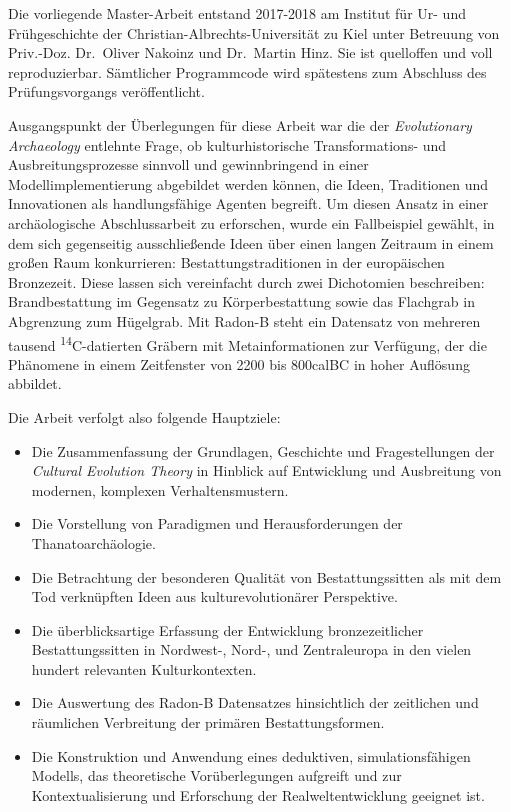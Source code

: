 \documentclass[openany,twoside,twocolumn]{book}
\providecommand{\tightlist}{%
  \setlength{\itemsep}{0pt}\setlength{\parskip}{0pt}}
\begin{document}
Die vorliegende Master-Arbeit entstand 2017-2018 am Institut für Ur- und
Frühgeschichte der Christian-Albrechts-Universität zu Kiel unter
Betreuung von Priv.-Doz. Dr.~Oliver Nakoinz und Dr.~Martin Hinz. Sie ist
quelloffen und voll reproduzierbar. Sämtlicher Programmcode wird
spätestens zum Abschluss des Prüfungsvorgangs veröffentlicht.

Ausgangspunkt der Überlegungen für diese Arbeit war die der
\emph{Evolutionary Archaeology} entlehnte Frage, ob kulturhistorische
Transformations- und Ausbreitungsprozesse sinnvoll und gewinnbringend in
einer Modellimplementierung abgebildet werden können, die Ideen,
Traditionen und Innovationen als handlungsfähige Agenten begreift. Um
diesen Ansatz in einer archäologische Abschlussarbeit zu erforschen,
wurde ein Fallbeispiel gewählt, in dem sich gegenseitig ausschließende
Ideen über einen langen Zeitraum in einem großen Raum konkurrieren:
Bestattungstraditionen in der europäischen Bronzezeit. Diese lassen sich
vereinfacht durch zwei Dichotomien beschreiben: Brandbestattung im
Gegensatz zu Körperbestattung sowie das Flachgrab in Abgrenzung zum
Hügelgrab. Mit Radon-B steht ein Datensatz von mehreren tausend
\textsuperscript{14}C-datierten Gräbern mit Metainformationen zur
Verfügung, der die Phänomene in einem Zeitfenster von 2200 bis 800calBC
in hoher Auflösung abbildet.

Die Arbeit verfolgt also folgende Hauptziele:

\begin{itemize}
\tightlist
\item
  Die Zusammenfassung der Grundlagen, Geschichte und Fragestellungen der
  \emph{Cultural Evolution Theory} in Hinblick auf Entwicklung und
  Ausbreitung von modernen, komplexen Verhaltensmustern.
\item
  Die Vorstellung von Paradigmen und Herausforderungen der
  Thanatoarchäologie.
\item
  Die Betrachtung der besonderen Qualität von Bestattungssitten als mit
  dem Tod verknüpften Ideen aus kulturevolutionärer Perspektive.
\item
  Die überblicksartige Erfassung der Entwicklung bronzezeitlicher
  Bestattungssitten in Nordwest-, Nord-, und Zentraleuropa in den vielen
  hundert relevanten Kulturkontexten.
\item
  Die Auswertung des Radon-B Datensatzes hinsichtlich der zeitlichen und
  räumlichen Verbreitung der primären Bestattungsformen.
\item
  Die Konstruktion und Anwendung eines deduktiven, simulationsfähigen
  Modells, das theoretische Vorüberlegungen aufgreift und zur
  Kontextualisierung und Erforschung der Realweltentwicklung geeignet
  ist.
\end{itemize}
\end{document}
